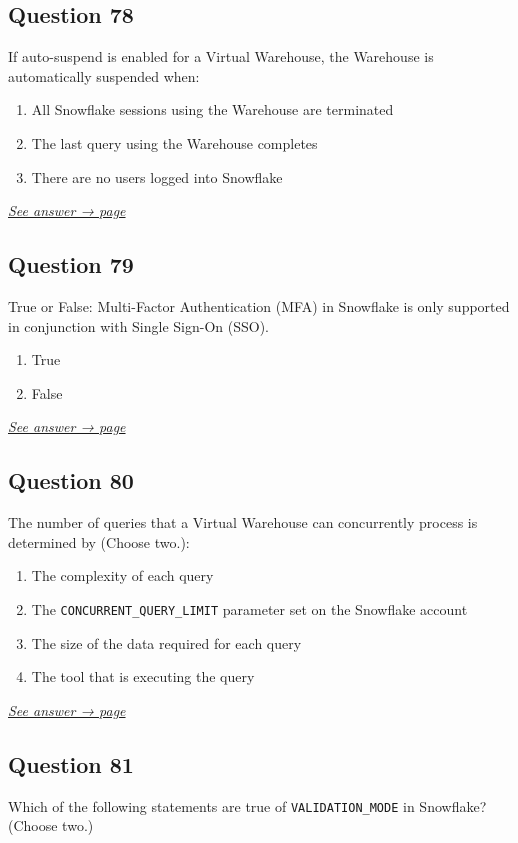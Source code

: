 \documentclass[12pt]{article}
\newcommand{\seeanswer}[1]{%
  \par\smallskip\emph{\hyperref[ans:#1]{See answer → page \pageref{ans:#1}}}%
}
\begin{document}
\subsection*{Question 78}\label{q:78}
If auto-suspend is enabled for a Virtual Warehouse, the Warehouse is automatically suspended when:

\begin{enumerate}[label=\Alph*.]
  \item All Snowflake sessions using the Warehouse are terminated
  \item The last query using the Warehouse completes
  \item There are no users logged into Snowflake
\end{enumerate}
\seeanswer{78}

\subsection*{Question 79}\label{q:79}
True or False: Multi-Factor Authentication (MFA) in Snowflake is only supported in conjunction with Single Sign-On (SSO).

\begin{enumerate}[label=\Alph*.]
  \item True
  \item False
\end{enumerate}
\seeanswer{79}

\subsection*{Question 80}\label{q:80}
The number of queries that a Virtual Warehouse can concurrently process is determined by (Choose two.):

\begin{enumerate}[label=\Alph*.]
  \item The complexity of each query
  \item The \texttt{CONCURRENT\_QUERY\_LIMIT} parameter set on the Snowflake account
  \item The size of the data required for each query
  \item The tool that is executing the query
\end{enumerate}
\seeanswer{80}

\subsection*{Question 81}\label{q:81}
Which of the following statements are true of \texttt{VALIDATION\_MODE} in Snowflake? (Choose two.)
\end{document}

